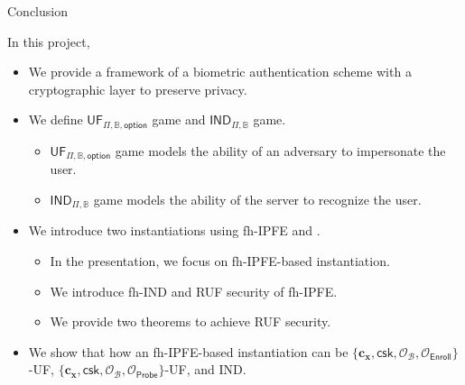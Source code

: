 \begin{frame}{Conclusion}

In this project,

\begin{itemize}
	\item<2-> We provide a framework of a biometric authentication scheme with a cryptographic layer to preserve privacy.

	\item<3-> We define $\textsf{UF}_{\Pi, \mathbb{B}, \textsf{option}}$ game and $\textsf{IND}_{\Pi, \mathbb{B}}$ game.
	\begin{itemize}
		\item<4-> $\textsf{UF}_{\Pi, \mathbb{B}, \textsf{option}}$ game models the ability of an adversary to impersonate the user.
		\pause
		\item<5-> $\textsf{IND}_{\Pi, \mathbb{B}}$ game models the ability of the server to recognize the user.
	\end{itemize}

	\item<6-> We introduce two instantiations using fh-IPFE and {}.
	\begin{itemize}
		\item<7-> In the presentation, we focus on fh-IPFE-based instantiation.
		\item<8-> We introduce \textsf{fh-IND} and \textsf{RUF} security of fh-IPFE.
		\item<9-> We provide two theorems to achieve \textsf{RUF} security. 
	\end{itemize}

	\item<10-> We show that how an fh-IPFE-based instantiation can be $\{ \mathbf{c_x}, \textsf{csk}, \mathcal{O}_\mathcal{B}, \mathcal{O}_{\textsf{Enroll}} \}$-UF, $\{ \mathbf{c_x}, \textsf{csk}, \mathcal{O}_\mathcal{B}, \mathcal{O}_{\textsf{Probe}} \}$-UF, and IND.

\end{itemize}


\end{frame}


